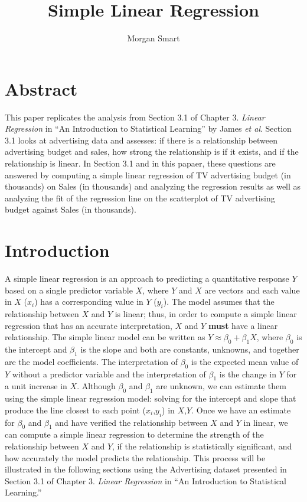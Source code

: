 \documentclass[12pt]{article}\usepackage[]{graphicx}\usepackage[]{color}
\begin{document}
\title{Simple Linear Regression}

\author{Morgan Smart}



\section{Abstract}

This paper replicates the analysis from Section 3.1 of Chapter 3. \textit{Linear Regression} in ``An Introduction to Statistical Learning'' by James \textit{et al}. Section 3.1 looks at advertising data and assesses: if there is a relationship between advertising budget and sales, how strong the relationship is if it exists, and if the relationship is linear. In Section 3.1 and in this papaer, these questions are answered by computing a simple linear regression of TV advertising budget (in thousands) on Sales (in thousands) and analyzing the regression results as well as analyzing the fit of the regression line on the scatterplot of TV advertising budget against Sales (in thousands).

\section{Introduction}

A simple linear regression is an approach to predicting a quantitative response $Y$ based on a single predictor variable $X$, where $Y$ and $X$ are vectors and each value in $X$ ($x_i$) has a corresponding value in $Y$ ($y_i$). The model assumes that the relationship between $X$ and $Y$ is linear; thus, in order to compute a simple linear regression that has an accurate interpretation, $X$ and $Y$ \textbf{must} have a linear relationship. The simple linear model can be written as $Y \approx \beta_0 + \beta_1X$, where $\beta_0$ is the intercept and $\beta_1$ is the slope and both are constants, unknowns, and together are the model coefficients. The interpretation of $\beta_0$ is the expected mean value of $Y$ without a predictor variable and the interpretation of $\beta_1$ is the change in $Y$ for a unit increase in $X$. Although $\beta_0$ and $\beta_1$ are unknown, we can estimate them using the simple linear regression model: solving for the intercept and slope that produce the line closest to each point ($x_i$,$y_i$) in $X$,$Y$. Once we have an estimate for $\beta_0$ and $\beta_1$ and have verified the relationship between $X$ and $Y$ in linear, we can compute a simple linear regression to determine the strength of the relationship between $X$ and $Y$, if the relationship is statistically significant, and how accurately the model predicts the relationship. This process will be illustrated in the following sections using the Advertising dataset presented in Section 3.1 of Chapter 3. \textit{Linear Regression} in ``An Introduction to Statistical Learning.''
\end{document}

